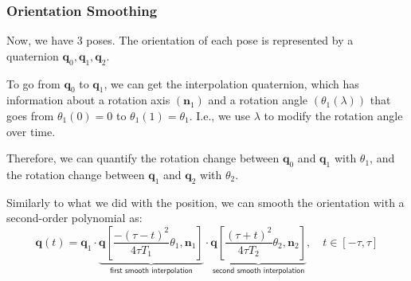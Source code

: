 \documentclass[10pt, aspectratio=169]{beamer}
\theoremstyle{remark}
\theoremstyle{definition}
\begin{document}
\begin{frame}[allowframebreaks]
\frametitle{Orientation Smoothing}
Now, we have 3 poses. The orientation of each pose is represented by a quaternion $\mathbf{q}_0, \mathbf{q}_1, \mathbf{q}_2$. 

To go from $\mathbf{q}_0$ to $\mathbf{q}_1$, we can get the interpolation quaternion, which has information about a rotation axis $(\mathbf{n}_1)$ and a rotation angle $(\theta_1(\lambda))$ that goes from $\theta_1(0) = 0$ to $\theta_1(1)=\theta_1$. I.e., we use $\lambda$ to modify the rotation angle over time. 

Therefore, we can quantify the rotation change between $\mathbf{q}_0$ and $\mathbf{q}_1$ with $\theta_1$, and the rotation change between $\mathbf{q}_1$ and $\mathbf{q}_2$ with $\theta_2$.


Similarly to what we did with the position, we can smooth the orientation with a second-order polynomial as:
\begin{equation}
    \mathbf{q}(t) = \mathbf{q}_1 \cdot  \underbrace{\mathbf{q} \left[\frac{-(\tau - t)^2}{4\tau T_1} \theta_1, \mathbf{n}_1 \right]}_{\textsf{first smooth interpolation}} \cdot \underbrace{\mathbf{q} \left[ \frac{(\tau + t)^2}{4\tau T_2} \theta_2, \mathbf{n}_2 \right]}_{\textsf{second smooth interpolation}}, \quad t\in[-\tau, \tau]
    \label{eq:q_smooth}
\end{equation}

\framebreak


\end{frame}
\end{document}
